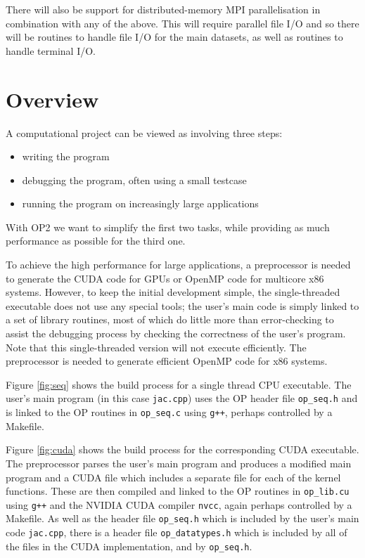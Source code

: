 \documentclass[11pt]{article}
\begin{document}
There will also be support for distributed-memory MPI 
parallelisation in combination with any of the above.  This will 
require parallel file I/O and so there will be routines to handle 
file I/O for the main datasets, as well as routines to handle 
terminal I/O.

\newpage
\section{Overview}

A computational project can be viewed as involving three steps:
\begin{itemize}
\item
writing the program
\item
debugging the program, often using a small testcase
\item
running the program on increasingly large applications
\end{itemize}

With OP2 we want to simplify the first two tasks, while 
providing as much performance as possible for the third one.  

To achieve the high performance for large applications, a 
preprocessor is needed to generate the CUDA code for GPUs 
or OpenMP code for multicore x86 systems.  However, to keep 
the initial development simple, the single-threaded executable 
does not use any special tools; the user's main code is simply 
linked to a set of library routines, most of which do little 
more than error-checking to assist the debugging process by 
checking the correctness of the user's program.  Note that this 
single-threaded version will not execute efficiently.  The
preprocessor is needed to generate efficient OpenMP code for 
x86 systems.

Figure \ref{fig:seq} shows the build process for a single 
thread CPU executable.  The user's main program (in this case 
{\tt jac.cpp}) uses the OP header file {\tt op\_seq.h} and is 
linked to the OP routines in {\tt op\_seq.c} using {\tt g++},
perhaps controlled by a Makefile.

Figure \ref{fig:cuda} shows the build process for the corresponding
CUDA executable.  The preprocessor parses the user's main program 
and produces a modified main program and a CUDA file which
includes a separate file for each of the kernel functions.  These 
are then compiled and linked to the OP routines in {\tt op\_lib.cu} 
using {\tt g++} and the NVIDIA CUDA compiler {\tt nvcc}, again 
perhaps controlled by a Makefile.
As well as the header file {\tt op\_seq.h} which is included by
the user's main code {\tt jac.cpp}, there is a header file
{\tt op\_datatypes.h} which is included by all of the files
in the CUDA implementation, and by {\tt op\_seq.h}.
\end{document}
